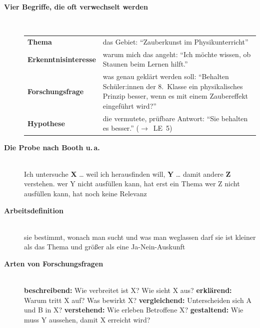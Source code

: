 \begin{description}
\item[{\rot\bf Vier Begriffe, die oft verwechselt werden}]~\\[-\lblskip]
\begin{center}
\small
\begin{tabular}{p{}p{}}
\toprule
\textbf{Thema} & das Gebiet: \enquote{Zauberkunst im Physikunterricht} \\
\textbf{Erkenntnis\-interesse} & warum mich das angeht: \enquote{Ich möchte
  wissen, ob Staunen beim Lernen hilft.} \\
\textbf{Forschungsfrage} & was genau geklärt werden soll: \enquote{Behalten
  Schüler:innen der 8.~Klasse ein physikalisches Prinzip besser, wenn es mit
  einem Zaubereffekt eingeführt wird?} \\
\textbf{Hypothese} & die vermutete, prüfbare Antwort: \enquote{Sie behalten
  es besser.} ($\to$~LE~5) \\
\bottomrule
\end{tabular}
\end{center}
\os{\newpage}

\item[{\rot\bf Die Probe nach Booth u.\,a.}]~\\[-\lblskip]
\bi
  \ite Ich untersuche \textbf{X} \dots
  \ite weil ich herausfinden will, \textbf{Y} \dots
  \ite damit andere \textbf{Z} verstehen.
  \ite wer Y nicht ausfüllen kann, hat erst ein Thema
  \ite wer Z nicht ausfüllen kann, hat noch keine Relevanz
    \parencite{booth2016craft}
\ei
\os{\newpage}

\item[{\rot\bf Arbeitsdefinition}]~\\
\bi
  \ite sie bestimmt, wonach man sucht und was man weglassen darf
  \ite sie ist kleiner als das Thema und größer als eine Ja-Nein-Auskunft
\ei
\os{\newpage}

\item[{\rot\bf Arten von Forschungsfragen}]~\\[-\lblskip]
\bi
  \ite \textbf{beschreibend:} Wie verbreitet ist X? Wie sieht X aus?
  \ite \textbf{erklärend:} Warum tritt X auf? Was bewirkt X?
  \ite \textbf{vergleichend:} Unterscheiden sich A und B in X?
  \ite \textbf{verstehend:} Wie erleben Betroffene X?
  \ite \textbf{gestaltend:} Wie muss Y aussehen, damit X erreicht wird?
\ei
{}
\os{\newpage}
\end{description}

